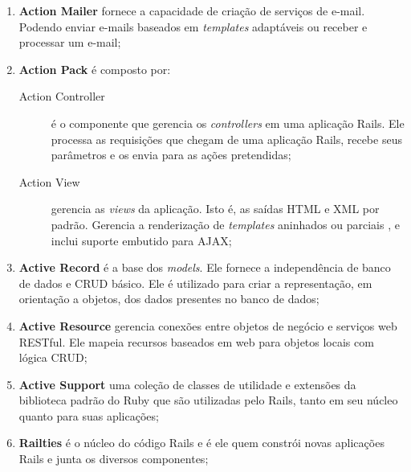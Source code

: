 \begin{enumerate}

	\item \textbf{Action Mailer} fornece a capacidade de criação de serviços de e-mail. Podendo enviar e-mails baseados em \textit{templates} adaptáveis ou receber e processar um e-mail;

	\item \textbf{Action Pack} é composto por: \\

	\begin{description}
 
	\item [Action Controller] é o componente que gerencia os \textit{controllers} em uma aplicação Rails. Ele processa as requisições que chegam de uma aplicação Rails, recebe seus
parâmetros e os envia para as ações pretendidas;

	\item [Action View] gerencia as \textit{views} da aplicação. Isto é, as saídas HTML e XML por 	padrão. Gerencia a renderização de \textit{templates} aninhados ou parciais , e inclui suporte
embutido para AJAX;

	\end{description}

\item \textbf{Active Record} é a base dos \textit{models}. Ele fornece a independência de banco de dados e CRUD básico. Ele é utilizado para criar a representação, em orientação a objetos, dos
dados presentes no banco de dados;

\item \textbf{Active Resource} gerencia conexões entre objetos de negócio e serviços web RESTful.
Ele mapeia recursos baseados em web para objetos locais com lógica CRUD;

\item \textbf{Active Support} uma coleção de classes de utilidade e extensões da biblioteca padrão do
Ruby que são utilizadas pelo Rails, tanto em seu núcleo quanto para suas aplicações;

\item \textbf{Railties} é o núcleo do código Rails e é ele quem constrói novas aplicações Rails e junta os diversos componentes;

\end{enumerate}


